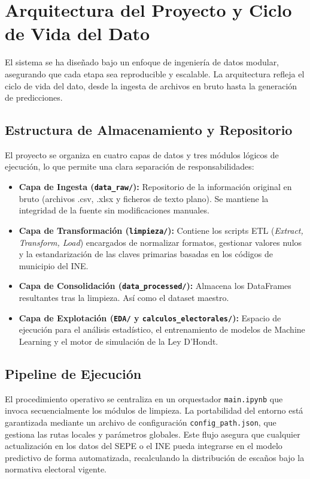\section{Arquitectura del Proyecto y Ciclo de Vida del Dato}

El sistema se ha diseñado bajo un enfoque de ingeniería de datos modular, asegurando que cada etapa sea reproducible y escalable. La arquitectura refleja el ciclo de vida del dato, desde la ingesta de archivos en bruto hasta la generación de predicciones.

\subsection{Estructura de Almacenamiento y Repositorio}
El proyecto se organiza en cuatro capas de datos y tres módulos lógicos de ejecución, lo que permite una clara separación de responsabilidades:

\begin{itemize}
    \item \textbf{Capa de Ingesta (\texttt{data\_raw/}):} Repositorio de la información original en bruto (archivos .csv, .xlsx y ficheros de texto plano). Se mantiene la integridad de la fuente sin modificaciones manuales.
    \item \textbf{Capa de Transformación (\texttt{limpieza/}):} Contiene los scripts ETL (\textit{Extract, Transform, Load}) encargados de normalizar formatos, gestionar valores nulos y la estandarización de las claves primarias basadas en los códigos de municipio del INE.
    \item \textbf{Capa de Consolidación (\texttt{data\_processed/}):} Almacena los DataFrames resultantes tras la limpieza. Así como el dataset maestro.
    \item \textbf{Capa de Explotación (\texttt{EDA/} y \texttt{calculos\_electorales/}):} Espacio de ejecución para el análisis estadístico, el entrenamiento de modelos de Machine Learning y el motor de simulación de la Ley D’Hondt.
\end{itemize}

\subsection{Pipeline de Ejecución}
El procedimiento operativo se centraliza en un orquestador \texttt{main.ipynb} que invoca secuencialmente los módulos de limpieza. La portabilidad del entorno está garantizada mediante un archivo de configuración \texttt{config\_path.json}, que gestiona las rutas locales y parámetros globales. Este flujo asegura que cualquier actualización en los datos del SEPE o el INE pueda integrarse en el modelo predictivo de forma automatizada, recalculando la distribución de escaños bajo la normativa electoral vigente.

